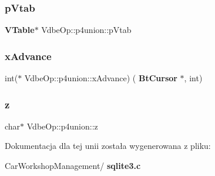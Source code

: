 \subsubsection{pVtab}
{\footnotesize\ttfamily \textbf{ V\+Table}$\ast$ Vdbe\+Op\+::p4union\+::p\+Vtab}

\mbox{\label{union_vdbe_op_1_1p4union_a41019a55e48410473fb18f8fb4f51169}} 
\subsubsection{xAdvance}
{\footnotesize\ttfamily int($\ast$ Vdbe\+Op\+::p4union\+::x\+Advance) (\textbf{ Bt\+Cursor} $\ast$, int)}

\mbox{\label{union_vdbe_op_1_1p4union_ab679a57e8d973f81a8d51f925502d430}} 
\subsubsection{z}
{\footnotesize\ttfamily char$\ast$ Vdbe\+Op\+::p4union\+::z}



Dokumentacja dla tej unii została wygenerowana z pliku\+:\begin{DoxyCompactItemize}
\item 
Car\+Workshop\+Management/\textbf{ sqlite3.\+c}\end{DoxyCompactItemize}
